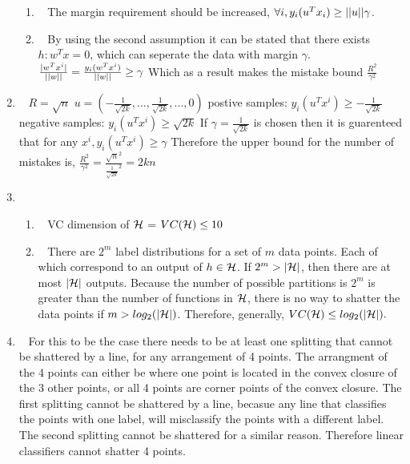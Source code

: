 \documentclass[12pt, fullpage,letterpaper]{article}
\begin{document}
\begin{enumerate}
\begin{enumerate}
		\item~
		\newline The margin requirement should be increased, $\forall i, y_i(u^Tx_i) \ge \lvert\lvert u\rvert\rvert\gamma$.

		\item~
		\newline By using the second assumption it can be stated that there exists $h : w^Tx=0$, which can seperate the data with margin $\gamma$.
		\newline $\frac{\lvert w^Tx^i\rvert}{\lvert\lvert w\rvert\rvert} = \frac{y_i(w^Tx^i)}{\lvert\lvert w\rvert\rvert} \ge \gamma$
		\newline Which as a result makes the mistake bound $\frac{R^2}{\gamma^2}$
	\end{enumerate}
	
	\item~
	\newline $R=\sqrt{n}$
	\newline $u = (-\frac{1}{\sqrt{2k}}, ... , \frac{1}{\sqrt{2k}}, ..., 0)$
	\newline postive samples: $y_i(u^Tx^i) \ge -\frac{1}{\sqrt{2k}}$
	\newline negative samples: $y_i(u^Tx^i) \ge \sqrt{2k}$
	\newline If $\gamma = \frac{1}{\sqrt{2k}}$ is chosen then it is guarenteed that for any $x^i, y_i(u^Tx^i) \ge \gamma$ 
	\newline Therefore the upper bound for the number of mistakes is, $\frac{R^2}{\gamma^2}=\frac{\sqrt{n}^2}{\frac{1}{\sqrt{2k}}^2}=2kn$

	\item~
	\begin{enumerate}
		\item~
		\newline VC dimension of $\mathcal{H}$ = $VC(\mathcal{H}) \le 10$
		\item~
		\newline There are $2^m$ label distributions for a set of $m$ data points. Each of which correspond to an output of $h \in \mathcal{H}$. If $2^m > \lvert\mathcal{H}\rvert$, then there are at most $\lvert\mathcal{H}\rvert$ outputs. Because the number of possible partitions is $2^m$ is greater than the number of functions in $\mathcal{H}$, there is no way to shatter the data points if $m > log_2(\lvert\mathcal{H}\rvert)$. Therefore, generally, $VC(\mathcal{H}) \le log_2(\lvert\mathcal{H}\rvert).$
	\end{enumerate}
	\item~
	\newline For this to be the case there needs to be at least one splitting that cannot be shattered by a line, for any arrangement of 4 points. The arrangment of the 4 points can either be where one point is located in the convex closure of the 3 other points, or all 4 points are corner points of the convex closure. The first splitting cannot be shattered by a line, becasue any line that classifies the points with one label, will misclassify the points with a different label. The second splitting cannot be shattered for a similar reason. Therefore linear classifiers cannot shatter 4 points. 
	

\end{enumerate}
\end{document}
